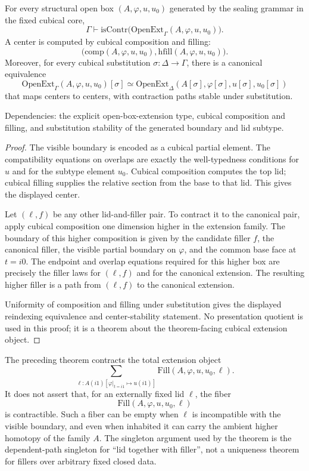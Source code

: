 \documentclass{lmcs}
\begin{document}
\begin{thm}
\label{thm:open-ext-contr}
For every structural open box \((A,\varphi,u,u_0)\) generated by the sealing grammar in the
fixed cubical core,
\[
  \Gamma \vdash
  \mathrm{isContr}\bigl(\mathrm{OpenExt}_{\Gamma}(A,\varphi,u,u_0)\bigr).
\]
A center is computed by cubical composition and filling:
\[
  \bigl(\mathrm{comp}(A,\varphi,u,u_0),
        \mathrm{hfill}(A,\varphi,u,u_0)\bigr).
\]
Moreover, for every cubical substitution \(\sigma:\Delta\to\Gamma\), there is a canonical
equivalence
\[
  \mathrm{OpenExt}_{\Gamma}(A,\varphi,u,u_0)[\sigma]
  \simeq
  \mathrm{OpenExt}_{\Delta}(A[\sigma],\varphi[\sigma],u[\sigma],u_0[\sigma])
\]
that maps centers to centers, with contraction paths stable under substitution.

Dependencies: the explicit open-box-extension type, cubical composition and filling, and
substitution stability of the generated boundary and lid subtype.
\end{thm}

\begin{proof}
The visible boundary is encoded as a cubical partial element.  The compatibility equations on
overlaps are exactly the well-typedness conditions for \(u\) and for the subtype element
\(u_0\).  Cubical composition computes the top lid; cubical filling supplies the relative
section from the base to that lid.  This gives the displayed center.

Let \((\ell,f)\) be any other lid-and-filler pair.  To contract it to the canonical pair, apply
cubical composition one dimension higher in the extension family.  The boundary of this
higher composition is given by the candidate filler \(f\), the canonical filler, the visible
partial boundary on \(\varphi\), and the common base face at \(t=i0\).  The endpoint and
overlap equations required for this higher box are precisely the filler laws for \((\ell,f)\)
and for the canonical extension.  The resulting higher filler is a path from \((\ell,f)\) to
the canonical extension.

Uniformity of composition and filling under substitution gives the displayed reindexing
equivalence and center-stability statement.  No presentation quotient is used in this proof;
it is a theorem about the theorem-facing cubical extension object.
\end{proof}

\begin{rem}
\label{rem:fixed-lid-fibers}
The preceding theorem contracts the total extension object
\[
  \sum_{\ell:A(i1)[\varphi|_{t=i1}\mapsto u(i1)]}
  \mathrm{Fill}(A,\varphi,u,u_0,\ell).
\]
It does not assert that, for an externally fixed lid \(\ell\), the fiber
\[
  \mathrm{Fill}(A,\varphi,u,u_0,\ell)
\]
is contractible.  Such a fiber can be empty when \(\ell\) is incompatible with the visible
boundary, and even when inhabited it can carry the ambient higher homotopy of the family
\(A\).  The singleton argument used by the theorem is the dependent-path singleton for
``lid together with filler'', not a uniqueness theorem for fillers over arbitrary fixed
closed data.
\end{rem}
\end{document}
